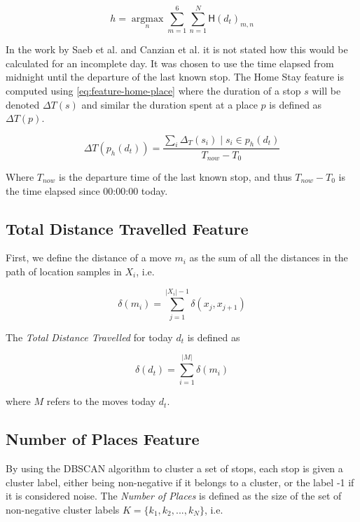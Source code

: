 \begin{equation}
\label{eq:feature-home-place}
h = \operatorname*{argmax}_n \sum_{m=1}^{6} \sum_{n=1}^{N}  \mathsf{H}(d_t)_{m,n}
\end{equation}

In the work by Saeb et al. \cite{Saeb2015} and Canzian et al.\cite{Canzian2015} it is not stated how this would be calculated for an incomplete day. It was chosen to use the time elapsed from midnight until the departure of the last known stop. The Home Stay feature is computed using \eqref{eq:feature-home-place} where the duration of a stop $s$ will be denoted $\Delta T (s)$ and similar the duration spent at a place $p$ is defined as $\Delta T (p)$.

\begin{equation}
\label{eq:feature-home-place}
\Delta T(p_{h} (d_t) )= \frac{\sum_i \Delta_T (s_i) \;|\; s_i \in p_h (d_t)}{T_{now} - T_{0}}
\end{equation}

Where $T_{now}$ is the departure time of the last known stop, and thus $T_{now} - T_0$ is the time elapsed since 00:00:00 today.

\subsection{Total Distance Travelled Feature}
First, we define the distance of a move $m_i$ as the sum of all the distances in the path of location samples in $X_i$, i.e.

\begin{equation}
\label{eq:feature-move-computation}
\delta (m_i)  = \sum_{j=1}^{|X_i|-1} \delta (x_j, x_{j+1})
\end{equation}

The \textit{Total Distance Travelled} for today $d_t$ is defined as 

\begin{equation}
\label{eq:feature-total-distance}
\delta (d_t) = \sum_{i=1}^{|M|} \delta (m_i)
\end{equation}

where $M$ refers to the moves today $d_t$.

\subsection{Number of Places Feature}
By using the DBSCAN algorithm to cluster a set of stops, each stop is given a cluster label, either being non-negative if it belongs to a cluster, or the label -1 if it is considered noise. The \textit{Number of Places} is defined as the size of the set of non-negative cluster labels $K = \{k_1, k_2, ..., k_N\}$, i.e.

